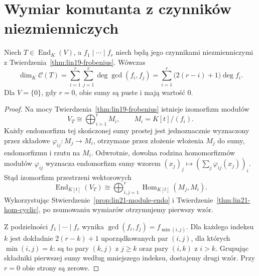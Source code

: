 \section{Wymiar komutanta z czynników niezmienniczych}
\label{sec:lin21-invariant}

\begin{twierdzenie}
\label{thm:lin21-invariant-dimension}
Niech \(T\in\operatorname{End}_K(V)\),
a \(f_1\mid\cdots\mid f_r\)
niech będą jego czynnikami
niezmienniczymi z
Twierdzenia~\ref{thm:lin19-frobenius}.
Wówczas
\[
 \dim_K\mathcal C(T)
 =\sum_{i=1}^{r}\sum_{j=1}^{r}
       \deg\gcd(f_i,f_j)
 =\sum_{i=1}^{r}\bigl(2(r-i)+1\bigr)\deg f_i.
\]
Dla \(V=\{0\}\), gdy \(r=0\),
obie sumy są puste i mają wartość \(0\).
\end{twierdzenie}
\begin{proof}
Na mocy Twierdzenia~\ref{thm:lin19-frobenius}
istnieje izomorfizm modułów
\[
 V_T\cong\bigoplus_{i=1}^{r}M_i,
 \qquad M_i=K[t]/(f_i).
\]
Każdy endomorfizm tej skończonej
sumy prostej jest jednoznacznie
wyznaczony przez składowe
\(\varphi_{ij}\colon M_j\to M_i\),
otrzymane przez złożenie
włożenia \(M_j\) do sumy,
endomorfizmu i rzutu na \(M_i\).
Odwrotnie, dowolna rodzina
homomorfizmów modułów \(\varphi_{ij}\)
wyznacza endomorfizm sumy
wzorem
\((x_j)_j\mapsto(\sum_j\varphi_{ij}(x_j))_i\).
Stąd izomorfizm przestrzeni wektorowych
\[
 \operatorname{End}_{K[t]}(V_T)
 \cong\bigoplus_{i,j=1}^{r}
       \operatorname{Hom}_{K[t]}(M_j,M_i).
\]
Wykorzystując
Stwierdzenie~\ref{prop:lin21-module-endo}
i Twierdzenie~\ref{thm:lin21-hom-cyclic},
po zsumowaniu wymiarów
otrzymujemy pierwszy wzór.

Z podzielności \(f_1\mid\cdots\mid f_r\)
wynika
\(\gcd(f_i,f_j)=f_{\min(i,j)}\).
Dla każdego indeksu \(k\)
jest dokładnie \(2(r-k)+1\)
uporządkowanych par \((i,j)\),
dla których \(\min(i,j)=k\):
są to pary \((k,j)\) z \(j\ge k\)
oraz pary \((i,k)\) z \(i>k\).
Grupując składniki pierwszej sumy
według mniejszego indeksu,
dostajemy drugi wzór.
Przy \(r=0\) obie strony są zerowe.
\end{proof}

